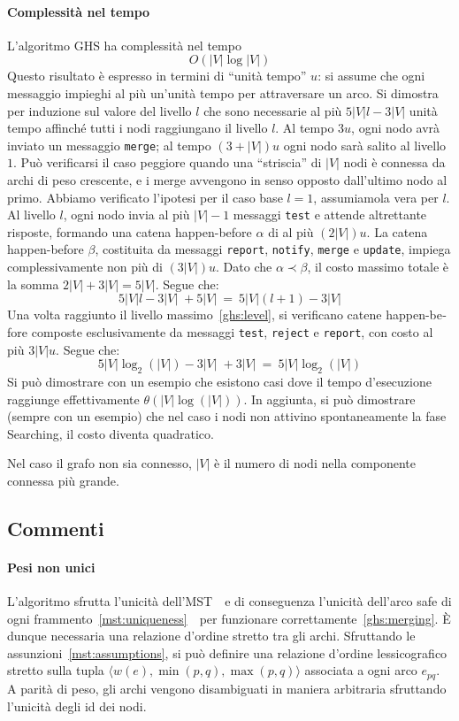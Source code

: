 \documentclass[target=bach,aauheader=,style=]{thud}
\newcommand{\eng}[1]{\foreignlanguage{english}{#1}}
\begin{document}
\paragraph{Complessità nel tempo}\label{ghs:complexity:time}
L'algoritmo GHS ha complessità nel tempo
$$
O(|V|\log|V|)
$$
Questo risultato è espresso in termini di ``unità tempo'' $u$: si assume che ogni messaggio impieghi al più un'unità tempo per attraversare un arco. Si dimostra per induzione sul valore del livello $l$ che sono necessarie al più $5|V|l-3|V|$ unità tempo affinché tutti i nodi raggiungano il livello $l$. Al tempo $3u$, ogni nodo avrà inviato un messaggio \lstinline{merge}; al tempo $(3+|V|)u$ ogni nodo sarà salito al livello $1$. Può verificarsi il caso peggiore quando una ``striscia'' di $|V|$ nodi è connessa da archi di peso crescente, e i \eng{merge} avvengono in senso opposto dall'ultimo nodo al primo. Abbiamo verificato l'ipotesi per il caso base $l=1$, assumiamola vera per $l$. Al livello $l$, ogni nodo invia al più $|V|-1$ messaggi \lstinline{test} e attende altrettante risposte, formando una catena \eng{happen-before} $\alpha$ di al più $(2|V|)u$. La catena \eng{happen-before} $\beta$, costituita da messaggi \lstinline{report}, \lstinline{notify}, \lstinline{merge} e \lstinline{update}, impiega complessivamente non più di $(3|V|)u$. Dato che $\alpha\prec\beta$, il costo massimo totale è la somma $2|V|+3|V|=5|V|$. Segue che:
$$
5|V|l-3|V|\;+5|V|\:=\:5|V|(l+1)-3|V|
$$
Una volta raggiunto il livello massimo~\ref{ghs:level}, si verificano catene \eng{happen-before} composte esclusivamente da messaggi \lstinline{test}, \lstinline{reject} e \lstinline{report}, con costo al più $3|V|u$. Segue che:
$$
5|V|\log_2(|V|)-3|V|\;+3|V|\:=\:5|V|\log_2(|V|)
$$
Si può dimostrare con un esempio che esistono casi dove il tempo d'esecuzione raggiunge effettivamente $\theta(|V|\log(|V|))$. In aggiunta, si può dimostrare (sempre con un esempio) che nel caso i nodi non attivino spontaneamente la fase \eng{Searching}, il costo diventa quadratico.

Nel caso il grafo non sia connesso, $|V|$ è il numero di nodi nella componente connessa più grande.

\subsection{Commenti}

\paragraph{Pesi non unici}\label{ghs:weights}
L'algoritmo sfrutta l'unicità dell'MST \,\textendash\, e di conseguenza l'unicità dell'arco \eng{safe} di ogni frammento~\ref{mst:uniqueness} \,\textendash\, per funzionare correttamente~\ref{ghs:merging}. È dunque necessaria una relazione d'ordine stretto tra gli archi. Sfruttando le assunzioni~\ref{mst:assumptions}, si può definire una relazione d'ordine lessicografico stretto sulla tupla $\langle w(e),\min(p,q),\max(p,q)\rangle$ associata a ogni arco $e_{pq}$. A parità di peso, gli archi vengono disambiguati in maniera arbitraria sfruttando l'unicità degli id dei nodi.
\end{document}

